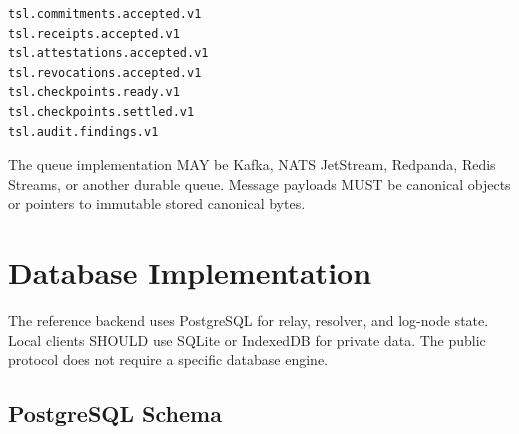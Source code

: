 \documentclass[11pt]{article}
\begin{document}
\begin{lstlisting}[style=tslcode]
tsl.commitments.accepted.v1
tsl.receipts.accepted.v1
tsl.attestations.accepted.v1
tsl.revocations.accepted.v1
tsl.checkpoints.ready.v1
tsl.checkpoints.settled.v1
tsl.audit.findings.v1
\end{lstlisting}

The queue implementation MAY be Kafka, NATS JetStream, Redpanda, Redis Streams, or another durable queue. Message payloads MUST be canonical objects or pointers to immutable stored canonical bytes.

\section{Database Implementation}

The reference backend uses PostgreSQL for relay, resolver, and log-node state. Local clients SHOULD use SQLite or IndexedDB for private data. The public protocol does not require a specific database engine.

\subsection{PostgreSQL Schema}
\end{document}
